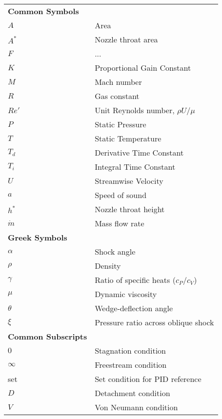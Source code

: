\begin{spacing}{1.0}
\begin{longtable}[htbp]{@{}p{} p{}@{}}
        \textbf{Common Symbols}\\ [2ex] 
        $A$ & Area \\ [2ex]
        $A^*$ & Nozzle throat area \\ [2ex]
        $F$ & ...\\ [2ex]
        $K$ & Proportional Gain Constant \\ [2ex]
        $M$ & Mach number\\ [2ex]
        $R$ & Gas constant\\ [2ex]
        $Re'$ & Unit Reynolds number, $\rho U/\mu$\\ [2ex]
        $P$ & Static Pressure\\ [2ex]
        $T$ & Static Temperature\\ [2ex]
        $T_d$ & Derivative Time Constant\\ [2ex]
        $T_i$ & Integral Time Constant\\ [2ex]
        $U$ & Streamwise Velocity\\ [2ex]
        $a$ & Speed of sound\\ [2ex]
        $h^*$ & Nozzle throat height\\ [2ex]
        $\dot{m}$ & Mass flow rate\\ [2ex]

        \textbf{Greek Symbols}\\ [2ex] 
        $\alpha$ & Shock angle\\ [2ex]
        $\rho$ & Density\\ [2ex]
        $\gamma$ & Ratio of specific heats ($c_P/c_V$) \\ [2ex]
        $\mu$ & Dynamic viscosity\\ [2ex]
        $\theta$ & Wedge-deflection angle \\ [2ex]
        $\xi$ & Pressure ratio across oblique shock\\ [2ex]

        \textbf{Common Subscripts}\\ [2ex] 
        $0$ & Stagnation condition\\ [2ex] 
        $\infty$ & Freestream condition\\ [2ex]
        set & Set condition for PID reference\\ [2ex]
        $D$ & Detachment condition\\ [2ex]
        $V$ & Von Neumann condition\\ [2ex]


	\end{longtable}
\end{spacing}

\pagebreak{}
